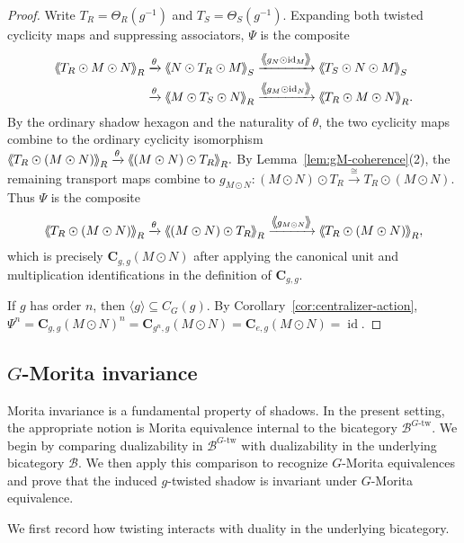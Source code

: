 \documentclass[11pt,oneside]{amsart}
\DeclareMathOperator{\id}{id}
\numberwithin{equation}{section}
\numberwithin{figure}{section}
\theoremstyle{plain}
\theoremstyle{definition}
\theoremstyle{remark}
\newcommand{\shspace}{\hspace{.5mm}} %
\newcommand{\sh}[1]{{\ensuremath{\shspace\hspace{1mm}\makebox[-1mm]{$\langle$}\makebox[0mm]{$\langle$}\hspace{1mm}{#1}\makebox[1mm]{$\rangle$}\makebox[0mm]{$\rangle$}\shspace}}}
\begin{document}
\begin{proof}
Write
\(
T_R=\Theta_R(g^{-1})
\)
and
\(
T_S=\Theta_S(g^{-1}).
\)
Expanding both twisted cyclicity maps and suppressing associators,
\(\Psi\) is the composite
\begin{align*}
\sh{T_R\odot M\odot N}_R
&\xrightarrow{\theta}
\sh{N\odot T_R\odot M}_S
\xrightarrow{\sh{g_N\odot\id_M}}
\sh{T_S\odot N\odot M}_S \\
&\xrightarrow{\theta}
\sh{M\odot T_S\odot N}_R
\xrightarrow{\sh{g_M\odot\id_N}}
\sh{T_R\odot M\odot N}_R.
\end{align*}
By the ordinary shadow hexagon and the naturality of \(\theta\), the
two cyclicity maps combine to the ordinary cyclicity isomorphism
\(
\sh{T_R\odot(M\odot N)}_R
\xrightarrow{\theta}
\sh{(M\odot N)\odot T_R}_R.
\)
By Lemma~\ref{lem:gM-coherence}(2), the remaining transport maps combine
to
\(
g_{M\odot N}\colon
(M\odot N)\odot T_R
\xrightarrow{\cong}
T_R\odot(M\odot N).
\)
Thus \(\Psi\) is the composite
\[
\sh{T_R\odot(M\odot N)}_R
\xrightarrow{\theta}
\sh{(M\odot N)\odot T_R}_R
\xrightarrow{\sh{g_{M\odot N}}}
\sh{T_R\odot(M\odot N)}_R,
\]
which is precisely
\(\mathbf C_{g,g}(M\odot N)\) after applying the canonical unit and
multiplication identifications in the definition of
\(\mathbf C_{g,g}\).

If \(g\) has order \(n\), then
\(\langle g\rangle\subseteq C_G(g)\). By
Corollary~\ref{cor:centralizer-action},
\(
\Psi^n
=
\mathbf C_{g,g}(M\odot N)^n
=
\mathbf C_{g^n,g}(M\odot N)
=
\mathbf C_{e,g}(M\odot N)
=
\id.
\)
\end{proof}

 





\subsection{\(G\)-Morita invariance}

Morita invariance is a fundamental property of shadows. In the present
setting, the appropriate notion is Morita equivalence internal to the
bicategory \(\mathcal B^{G\text{-tw}}\). We begin by comparing
dualizability in \(\mathcal B^{G\text{-tw}}\) with dualizability in the
underlying bicategory \(\mathcal B\). We then apply this comparison to
recognize \(G\)-Morita equivalences and prove that the induced
\(g\)-twisted shadow is invariant under \(G\)-Morita equivalence.

We first record how twisting interacts with duality in the underlying bicategory.
\end{document}
